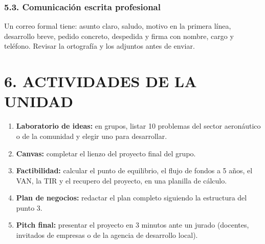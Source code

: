 \subsubsection*{5.3. Comunicación escrita profesional}
Un correo formal tiene: asunto claro, saludo, motivo en la primera línea, desarrollo breve,
pedido concreto, despedida y firma con nombre, cargo y teléfono. Revisar la ortografía y los
adjuntos antes de enviar.

\section*{6. ACTIVIDADES DE LA UNIDAD}

\begin{enumerate}
  \item \textbf{Laboratorio de ideas:} en grupos, listar 10 problemas del sector aeronáutico o
        de la comunidad y elegir uno para desarrollar.
  \item \textbf{Canvas:} completar el lienzo del proyecto final del grupo.
  \item \textbf{Factibilidad:} calcular el punto de equilibrio, el flujo de fondos a 5 años,
        el VAN, la TIR y el recupero del proyecto, en una planilla de cálculo.
  \item \textbf{Plan de negocios:} redactar el plan completo siguiendo la estructura del
        punto 3.
  \item \textbf{Pitch final:} presentar el proyecto en 3 minutos ante un jurado (docentes,
        invitados de empresas o de la agencia de desarrollo local).
\end{enumerate}
